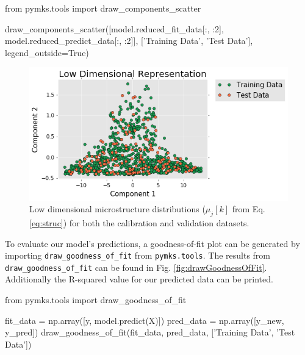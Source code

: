 \documentclass{bmcart}
\newcommand{\fimage}
{\fcolorbox{outcolor}{white}}
{}
\begin{document}
\begin{_input}
from pymks.tools import draw_components_scatter

draw_components_scatter([model.reduced_fit_data[:, :2], 
                         model.reduced_predict_data[:, :2]],
                        ['Training Data', 'Test Data'],
                        legend_outside=True)

\end{_input}

\begin{figure}
    \centering
    \includegraphics[scale=.61]{pymks_paper_homogenization_files/pymks_paper_homogenization_23_0.png}
    \caption{Low dimensional microstructure distributions ($\mu_j[k]$ from Eq. \ref{eq:struc}) for both the calibration and validation
    datasets.}
    \label{fig:drawComponentsScatter}
\end{figure}

    
    To evaluate our model's predictions, a goodness-of-fit plot can
be generated by importing \texttt{draw\_goodness\_of\_fit} from
\texttt{pymks.tools}. The results from \texttt{draw\_goodness\_of\_fit}
can be found in Fig. \ref{fig:drawGoodnessOfFit}. Additionally the R-squared
value for our predicted data can be printed.

\begin{_input}
from pymks.tools import draw_goodness_of_fit

fit_data = np.array([y, model.predict(X)])
pred_data = np.array([y_new, y_pred])
draw_goodness_of_fit(fit_data, pred_data,
                     ['Training Data', 'Test Data'])
\end{_input}
\end{document}
